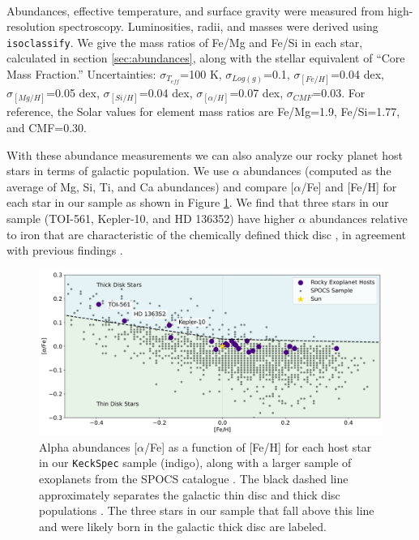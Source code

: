 \documentclass[twocolumn]{aastex631}
\begin{document}
\begin{table}
\begin{tabular}{|c|c|c|h|c|c|c|c|c|C|c|c|c|c|}
\end{tabular}
      \small
      \\
      Abundances, effective temperature, and surface gravity were measured from high-resolution spectroscopy. Luminosities, radii, and masses were derived using \texttt{isoclassify}. We give the mass ratios of Fe/Mg and Fe/Si in each star, calculated in section \ref{sec:abundances}, along with the stellar equivalent of ``Core Mass Fraction.'' Uncertainties: $\sigma_{T_{eff}}$=100 K, $\sigma_{Log(g)}$=0.1, $\sigma_{[Fe/H]}$=0.04 dex, $\sigma_{[Mg/H]}$=0.05 dex, $\sigma_{[Si/H]}$=0.04 dex, $\sigma_{[\alpha/H]}$=0.07 dex, $\sigma_{CMF}$=0.03. For reference, the Solar values for element mass ratios are Fe/Mg=1.9, Fe/Si=1.77, and CMF=0.30. 

\end{table}

With these abundance measurements we can also analyze our rocky planet host stars in terms of galactic population. We use $\alpha$ abundances (computed as the average of Mg, Si, Ti, and Ca abundances) and compare [$\alpha$/Fe] and [Fe/H] for each star in our sample as shown in Figure \ref{fig:alpha}. We find that three stars in our sample (TOI-561, Kepler-10, and HD 136352) have higher $\alpha$ abundances relative to iron that are characteristic of the chemically defined thick disc \citep{2006MNRAS.367.1329R}, in agreement with previous findings \citep{2014ApJ...789..154D, 2020AJ....160..129K, 2021AJ....161...56W}. 

 \begin{figure}
    \centering
    \includegraphics[width=1.0\textwidth]{Alpha_Abundances.png}
   
    \caption{Alpha abundances [$\alpha$/Fe] as a function of [Fe/H] for each host star in our \texttt{KeckSpec} sample (indigo), along with a larger sample of exoplanets from the SPOCS catalogue \citep{Brewer_2018}. The black dashed line approximately separates the galactic thin disc and thick disc populations \citep{2021AJ....161...56W}. The three stars in our sample that fall above this line and were likely born in the galactic thick disc are labeled. }
    \label{fig:alpha}
\end{figure}
\end{document}
